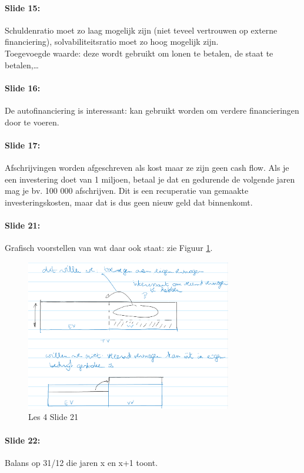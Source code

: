 \documentclass[10pt,a4paper]{report}
\begin{document}
\paragraph{Slide 15:} Schuldenratio moet zo laag mogelijk zijn (niet teveel vertrouwen op externe financiering), solvabiliteitsratio moet zo hoog mogelijk zijn.\\
Toegevoegde waarde: deze wordt gebruikt om lonen te betalen, de staat te betalen,…

\paragraph{Slide 16:} De autofinanciering is interessant: kan gebruikt worden om verdere financieringen door te voeren.

\paragraph{Slide 17:} Afschrijvingen worden afgeschreven als kost maar ze zijn geen cash flow. Als je een investering doet van 1 miljoen, betaal je dat en gedurende de volgende jaren mag je bv. 100 000 afschrijven. Dit is een recuperatie van gemaakte investeringskosten, maar dat is dus geen nieuw geld dat binnenkomt.

\paragraph{Slide 21:} Grafisch voorstellen van wat daar ook staat: zie Figuur \ref{les04_03}.

\begin{figure}[h!]
\centering
\includegraphics[width=90mm]{Les04_03.png}
\caption{Les 4 Slide 21} 
\label{les04_03}
\end{figure}

\paragraph{Slide 22:} Balans op 31/12 die jaren x en x+1 toont.
\end{document}
